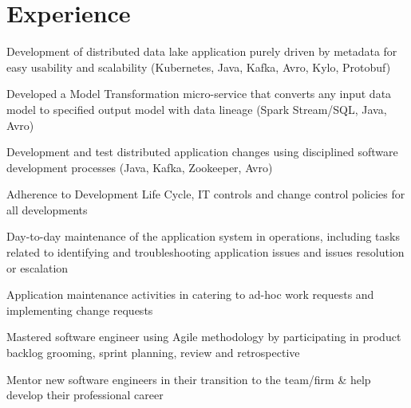 \documentclass[]{main}
\begin{document}
\begin{minipage}[t]{0.73\textwidth} 


\section{Experience}

\vspace{\topsep} %
\begin{tightemize}
\item Development of distributed data lake application purely driven by metadata for easy usability and scalability (Kubernetes, Java, Kafka, Avro, Kylo, Protobuf)
\item Developed a Model Transformation micro-service that converts any input data model to specified output model with data lineage (Spark Stream/SQL, Java, Avro) 
\item Development and test distributed application changes using disciplined software development processes (Java, Kafka, Zookeeper, Avro)
\item Adherence to Development Life Cycle, IT controls and change control policies for all developments
\item Day-to-day maintenance of the application system in operations, including tasks related to identifying and troubleshooting application issues and issues resolution or escalation
\item Application maintenance activities in catering to ad-hoc work requests and implementing change requests
\item Mastered software engineer using Agile methodology by participating in product backlog grooming, sprint planning, review and retrospective
\item Mentor new software engineers in their transition to the team/firm \& help develop their professional career
\end{tightemize}
\sectionsep


\end{minipage}
\end{document}
